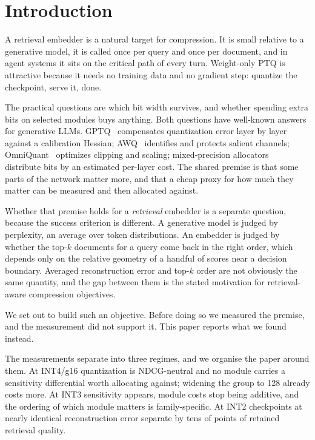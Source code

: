 \documentclass[11pt]{article}
\begin{document}
\section{Introduction}

A retrieval embedder is a natural target for compression. It is small relative to a
generative model, it is called once per query and once per document, and in agent systems it
sits on the critical path of every turn. Weight-only PTQ is attractive because it needs no
training data and no gradient step: quantize the checkpoint, serve it, done.

The practical questions are which bit width survives, and whether spending extra bits on
selected modules buys anything. Both questions have well-known answers for generative
LLMs. GPTQ~\cite{gptq} compensates quantization error layer by layer against a calibration
Hessian; AWQ~\cite{awq} identifies and protects salient channels;
OmniQuant~\cite{omniquant} optimizes clipping and scaling; mixed-precision
allocators~\cite{impq} distribute bits by an estimated per-layer cost. The shared premise is
that some parts of the network matter more, and that a cheap proxy for how much they matter
can be measured and then allocated against.

Whether that premise holds for a \emph{retrieval} embedder is a separate question, because
the success criterion is different. A generative model is judged by perplexity, an average
over token distributions. An embedder is judged by whether the top-$k$ documents for a query
come back in the right order, which depends only on the relative geometry of a handful of
scores near a decision boundary. Averaged reconstruction error and top-$k$ order are not
obviously the same quantity, and the gap between them is the stated motivation for
retrieval-aware compression objectives.

We set out to build such an objective. Before doing so we measured the premise, and the
measurement did not support it. This paper reports what we found instead.

The measurements separate into three regimes, and we organise the paper around them. At
INT4/g16 quantization is NDCG-neutral and no module carries a sensitivity differential worth
allocating against; widening the group to 128 already costs more. At INT3 sensitivity appears, module costs stop being additive, and the
ordering of which module matters is family-specific. At INT2 checkpoints at nearly identical
reconstruction error separate by tens of points of retained retrieval quality.
\end{document}
